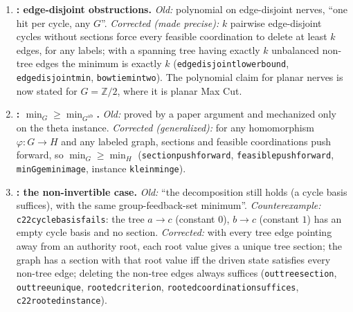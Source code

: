 \documentclass[11pt,a4paper]{article}
\theoremstyle{plain}
\theoremstyle{definition}
\theoremstyle{remark}
\renewcommand{\_}{\origunderscore\allowbreak}
\begin{document}
\begin{enumerate}[leftmargin=*, label=\textbf{E\arabic*.}]
\item \textbf{: edge-disjoint obstructions.}
  \emph{Old:} polynomial on edge-disjoint nerves, ``one hit per cycle, any $G$''. \emph{Corrected
  (made precise):} $k$ pairwise edge-disjoint cycles without sections force every feasible
  coordination to delete at least $k$ edges, for any labels; with a spanning tree having exactly $k$
  unbalanced non-tree edges the minimum is exactly $k$ (\texttt{edge\_disjoint\_lower\_bound},
  \texttt{edge\_disjoint\_min}, \texttt{bowtie\_min\_two}). The polynomial claim for planar nerves is
  now stated for $G = \mathbb{Z}/2$, where it is planar Max Cut.

\item \textbf{: $\min_G \ge \min_{G^{\mathrm{ab}}}$.}
  \emph{Old:} proved by a paper argument and mechanized only on the theta instance. \emph{Corrected
  (generalized):} for any homomorphism $\varphi : G \to H$ and any labeled graph, sections and feasible
  coordinations push forward, so $\min_G \ge \min_H$ (\texttt{section\_pushforward},
  \texttt{feasible\_pushforward}, \texttt{min\_G\_ge\_min\_image}, instance
  \texttt{klein\_min\_ge\_1}).

\item \textbf{: the non-invertible case.}
  \emph{Old:} ``the decomposition still holds (a cycle basis suffices), with the same
  group-feedback-set minimum''. \emph{Counterexample:} \texttt{c22\_cycle\_basis\_fails}: the tree
  $a \to c$ (constant $0$), $b \to c$ (constant $1$) has an empty cycle basis and no section.
  \emph{Corrected:} with every tree edge pointing away from an authority root, each root value gives a
  unique tree section; the graph has a section with that root value iff the driven state satisfies
  every non-tree edge; deleting the non-tree edges always suffices (\texttt{out\_tree\_section},
  \texttt{out\_tree\_unique}, \texttt{rooted\_criterion}, \texttt{rooted\_coordination\_suffices},
  \texttt{c22\_rooted\_instance}).


\end{enumerate}
\end{document}
